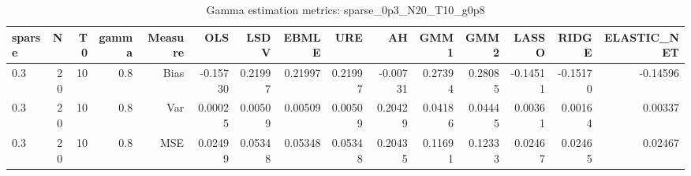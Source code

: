 \begin{table}[!htbp]\centering
\caption{Gamma estimation metrics: sparse_0p3_N20_T10_g0p8}
\label{tab:table1_sparse_0p3_N20_T10_g0p8}
\begin{tabular}{lrrrrrrrrrrrrrr}
\hline
sparse & N & T0 & gamma & Measure & OLS & LSDV & EBMLE & URE & AH & GMM1 & GMM2 & LASSO & RIDGE & ELASTIC_NET \\
\hline
0.3 & 20 & 10 & 0.8 & Bias & -0.15730 & 0.21997 & 0.21997 & 0.21997 & -0.00731 & 0.27394 & 0.28085 & -0.14511 & -0.15170 & -0.14596 \\
0.3 & 20 & 10 & 0.8 & Var & 0.00025 & 0.00509 & 0.00509 & 0.00509 & 0.20429 & 0.04186 & 0.04445 & 0.00361 & 0.00164 & 0.00337 \\
0.3 & 20 & 10 & 0.8 & MSE & 0.02499 & 0.05348 & 0.05348 & 0.05348 & 0.20435 & 0.11691 & 0.12333 & 0.02467 & 0.02465 & 0.02467 \\
\hline
\end{tabular}
\end{table}

